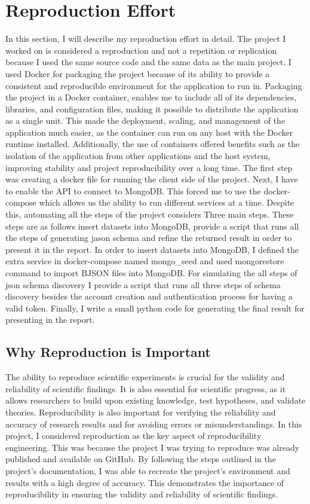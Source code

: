 \documentclass[sigconf]{acmart}
\begin{document}
\section*{Reproduction Effort}
In this section, I will describe my reproduction effort in detail. The project I worked on is considered a reproduction and not a repetition or replication because I used the same source code and the same data as the main project.
I used Docker for packaging the project because of its ability to provide a consistent and reproducible environment for the application to run in. Packaging the project in a Docker container, enables me to include all of its dependencies, libraries, and configuration files, making it possible to distribute the application as a single unit. This made the deployment, scaling, and management of the application much easier, as the container can run on any host with the Docker runtime installed. Additionally, the use of containers offered benefits such as the isolation of the application from other applications and the host system, improving stability and project reproducibility over a long time.
The first step was creating a docker file for running the client side of the project. Next, I have to enable the API to connect to MongoDB. This forced me to use the docker-compose which allows us the ability to run different services at a time. 
Despite this, automating all the steps of the project considers Three main steps. These steps are as follows insert datasets into MongoDB, provide a script that runs all the steps of generating jason schema and refine the returned result in order to present it in the report.
In order to insert datasets into MongoDB, I defined the extra service in docker-compose named mongo_seed and used mongorestore  command to import BJSON files into MongoDB.
For simulating the all steps of json schema discovery I provide a script that runs all three steps of schema discovery besides the account creation and  authentication process for having a valid token. Finally, I write a small python code for generating the final result for presenting in the report.



\subsection{Why Reproduction is Important}

The ability to reproduce scientific experiments is crucial for the validity and reliability of scientific findings. It is also essential for scientific progress, as it allows researchers to build upon existing knowledge, test hypotheses, and validate theories. Reproducibility is also important for verifying the reliability and accuracy of research results and for avoiding errors or misunderstandings.
In this project, I considered reproduction as the key aspect of reproducibility engineering. This was because the project I was trying to reproduce was already published and available on GitHub. By following the steps outlined in the project's documentation, I was able to recreate the project's environment and results with a high degree of accuracy. This demonstrates the importance of reproducibility in ensuring the validity and reliability of scientific findings.
\end{document}
